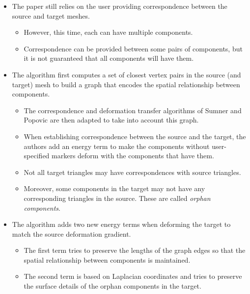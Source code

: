 \documentclass[10pt]{article}
\begin{document}
\begin{itemize}
    \item The paper still relies on the user providing correspondence between the source and target meshes.
    \begin{itemize}
        \item However, this time, each can have multiple components.
        
        \item Correspondence can be provided between some pairs of components, but it is not guaranteed that all components will have them.
    \end{itemize}
    
    \item The algorithm first computes a set of closest vertex pairs in the source (and target) mesh to build a graph that encodes the spatial relationship between components.
    \begin{itemize}
        \item The correspondence and deformation transfer algorithms of Sumner and Popovic are then adapted to take into account this graph.
        
        \item When establishing correspondence between the source and the target, the authors add an energy term to make the components without user-specified markers deform with the components that have them.
        
        \item Not all target triangles may have correspondences with source triangles. 
        
        \item Moreover, some components in the target may not have any corresponding triangles in the source. These are called \emph{orphan components}.        
    \end{itemize}
    
    \item The algorithm adds two new energy terms when deforming the target to match the source deformation gradient.
    \begin{itemize}
        \item The first term tries to preserve the lengths of the graph edges so that the spatial relationship between components is maintained.
        
        \item The second term is based on Laplacian coordinates \cite{Sorkine:2004:LSE} and tries to preserve the surface details of the orphan components in the target.
        

\end{itemize}
\end{itemize}
\end{document}

